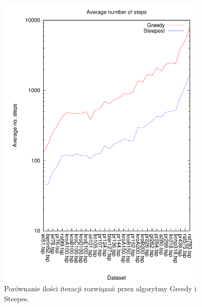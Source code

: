 \begin{figure}
\begin{center}
\includegraphics[width=0.9\textwidth]{wykresy/steps_comp}
\end{center}
\caption{Porównanie ilości iteracji rozwiązań przez algorytmy Greedy i Steepes.}
\label{steps_comp}
\end{figure}


